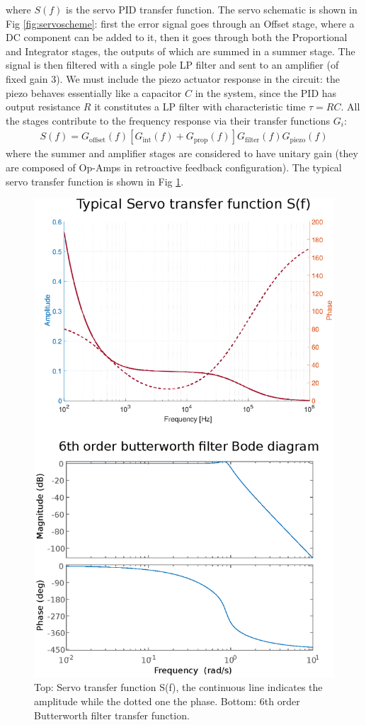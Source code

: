 where $S(f)$ is the servo PID transfer function. The servo schematic is shown in Fig \ref{fig:servoscheme}: first the error signal goes through an Offset stage, where a DC component can be added to it, then it goes through both the Proportional and Integrator stages, the outputs of which are summed in a summer stage. The signal is then filtered with a single pole LP filter and sent to an amplifier (of fixed gain 3). We must include the piezo actuator response in the circuit: the piezo behaves essentially like a capacitor $C$ in the system, since the PID has output resistance $R$ it constitutes a LP filter with characteristic time $\tau = RC$. All the stages contribute to the frequency response via their transfer functions $G_i$:
\begin{align}
	S(f) = G_\mathrm{offset}(f)[G_\mathrm{int}(f)+G_\mathrm{prop}(f)]G_\mathrm{filter}(f)G_\mathrm{piezo}(f)
\end{align}
where the summer and amplifier stages are considered to have unitary gain (they are composed of Op-Amps in retroactive feedback configuration). The typical servo transfer function is shown in Fig \ref{fig:servo}.
\begin{figure}
	\centering
	\includegraphics[width=0.8\linewidth]{images/servo.eps}
	\caption{Top: Servo transfer function S(f), the continuous line indicates the amplitude while the dotted one the phase.	Bottom: 6th order Butterworth filter transfer function.}
	\label{fig:servo}
\end{figure}

